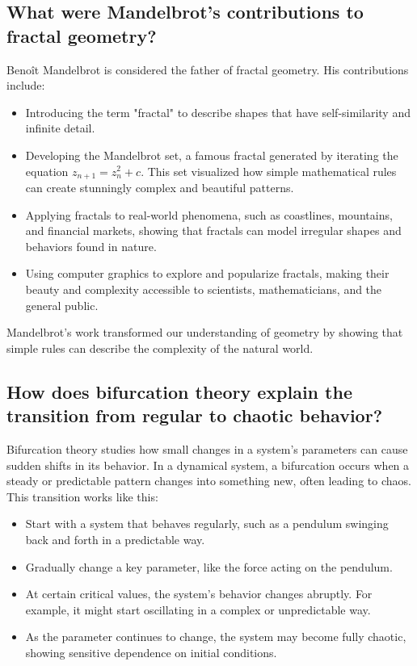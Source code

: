 \documentclass[12pt]{article}
\begin{document}
\subsection{What were Mandelbrot's contributions to fractal geometry?}
Benoît Mandelbrot is considered the father of fractal geometry. His contributions include:
\begin{itemize}
    \item Introducing the term "fractal" to describe shapes that have self-similarity and infinite detail.
    \item Developing the Mandelbrot set, a famous fractal generated by iterating the equation \( z_{n+1} = z_n^2 + c \). This set visualized how simple mathematical rules can create stunningly complex and beautiful patterns.
    \item Applying fractals to real-world phenomena, such as coastlines, mountains, and financial markets, showing that fractals can model irregular shapes and behaviors found in nature.
    \item Using computer graphics to explore and popularize fractals, making their beauty and complexity accessible to scientists, mathematicians, and the general public.
\end{itemize}
Mandelbrot's work transformed our understanding of geometry by showing that simple rules can describe the complexity of the natural world.

\subsection{How does bifurcation theory explain the transition from regular to chaotic behavior?}
Bifurcation theory studies how small changes in a system's parameters can cause sudden shifts in its behavior. In a dynamical system, a bifurcation occurs when a steady or predictable pattern changes into something new, often leading to chaos. This transition works like this:
\begin{itemize}
    \item Start with a system that behaves regularly, such as a pendulum swinging back and forth in a predictable way.
    \item Gradually change a key parameter, like the force acting on the pendulum.
    \item At certain critical values, the system's behavior changes abruptly. For example, it might start oscillating in a complex or unpredictable way.
    \item As the parameter continues to change, the system may become fully chaotic, showing sensitive dependence on initial conditions.
\end{itemize}
\end{document}
